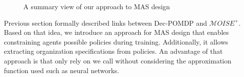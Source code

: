 \documentclass[runningheads]{llncs}
\begin{document}



\begin{figure}[h!]
    \centering
    
    \caption{A summary view of our approach to MAS design}
    \label{fig:design_approach}
\end{figure}

Previous section formally described links between Dec-POMDP and $\mathcal{M}OISE^+$. Based on that idea, we introduce an approach for MAS design that enables constraining agents possible policies during training. Additionally, it allows extracting organization specifications from policies. An advantage of that approach is that only rely on  we call  without considering the approximation function used such as neural networks.
\end{document}
